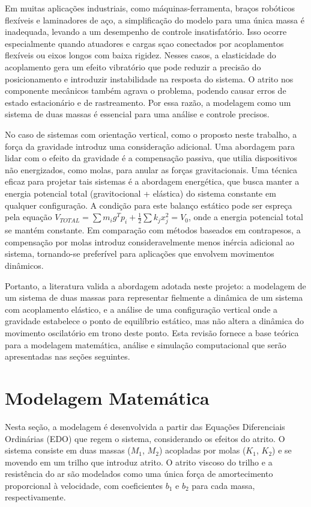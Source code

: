 \documentclass[9pt,a4paper,twocolumn,twoside]{tau-class/tau}
\begin{document}
Em muitas aplicações industriais, como máquinas-ferramenta, braços robóticos flexíveis e laminadores de aço, a simplificação do modelo para uma única massa é inadequada, levando a um desempenho de controle insatisfatório. Isso ocorre especialmente quando atuadores e cargas sçao conectados por acoplamentos flexíveis ou eixos longos com baixa rigidez. Nesses casos, a elasticidade do acoplamento gera um efeito vibratório que pode reduzir a precisão do posicionamento e introduzir instabilidade na resposta do sistema. O atrito nos componente mecânicos também agrava o problema, podendo causar erros de estado estacionário e de rastreamento. Por essa razão, a modelagem como um sistema de duas massas é essencial para uma análise e controle precisos. \cite{ComparativeStudy}

No caso de sistemas com orientação vertical, como o proposto neste trabalho, a força da gravidade introduz uma consideração adicional. Uma abordagem para lidar com o efeito da gravidade é a compensação passiva, que utilia dispositivos não energizados, como molas, para anular as forças gravitacionais. Uma técnica eficaz para projetar tais sistemas é a abordagem energética, que busca manter a energia potencial total (gravitocional + elástica) do sistema constante em qualquer configuração. A condição para este balanço estático pode ser espreça pela equação $V_{TOTAL} = \sum m_i g^T p_i + \frac{1}{2} \sum k_j x^2_j = V_0$, onde a energia potencial total se mantém constante. Em comparação com métodos baseados em contrapesos, a compensação por molas introduz consideravelmente menos inércia adicional ao sistema, tornando-se preferível para aplicações que envolvem movimentos dinâmicos. \cite{PassiveGravity}

Portanto, a literatura valida a abordagem adotada neste projeto: a modelagem de um sistema de duas massas para representar fielmente a dinâmica de um sistema com acoplamento elástico, e a análise de uma configuração vertical onde a gravidade estabelece o ponto de equilíbrio estático, mas não altera a dinâmica do movimento oscilatório em trono deste ponto. Esta revisão fornece a base teórica para a modelagem matemática, análise e simulação computacional que serão apresentadas nas seções seguintes.

\section{Modelagem Matemática}

Nesta seção, a modelagem é desenvolvida a partir das Equações Diferenciais Ordinárias (EDO) que regem o sistema, considerando os efeitos do atrito. O sistema consiste em duas massas ($M_1$, $M_2$) acopladas por molas ($K_1$, $K_2$) e se movendo em um trilho que introduz atrito. O atrito viscoso do trilho e a resistência do ar são modelados como uma única força de amortecimento proporcional à velocidade, com coeficientes $b_1$ e $b_2$ para cada massa, respectivamente.
\end{document}
